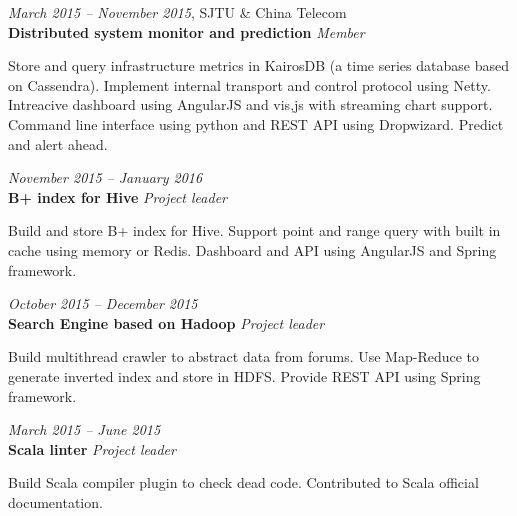 \documentclass[fontsize=10pt]{tccv}
\begin{document}
\begin{eventlist}

\textit{March 2015 -- November 2015}, SJTU \& China Telecom \\
\textbf{Distributed system monitor and prediction} \textit{Member}\smallskip

Store and query infrastructure metrics in KairosDB (a time series database based on Cassendra).
Implement internal transport and control protocol using Netty.
Intreacive dashboard using AngularJS and vis,js with streaming chart support.
Command line interface using python and REST API using Dropwizard.
Predict and alert ahead.

\medskip

\textit{November 2015 -- January 2016} \\
\textbf{B+ index for Hive} \textit{Project leader}\smallskip

Build and store B+ index for Hive.
Support point and range query with built in cache using memory or Redis.
Dashboard and API using AngularJS and Spring framework.

\medskip

\textit{October 2015 -- December 2015} \\
\textbf{Search Engine based on Hadoop} \textit{Project leader}\smallskip

Build multithread crawler to abstract data from forums.
Use Map-Reduce to generate inverted index and store in HDFS.
Provide REST API using Spring framework.

\medskip

\textit{March 2015 -- June 2015} \\
\textbf{Scala linter} \textit{Project leader}\smallskip

Build Scala compiler plugin to check dead code.
Contributed to Scala official documentation.

\medskip


%


\end{eventlist}
\end{document}
